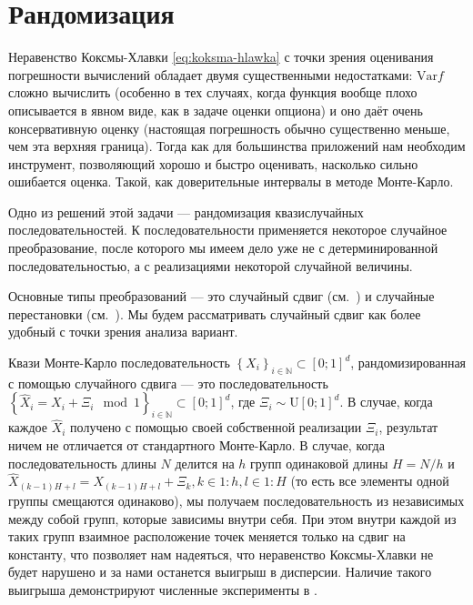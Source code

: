 \documentclass[specialist,
               substylefile = ../spbu.rtx,
               subf,href,colorlinks=true, 12pt]{disser}
\begin{document}
\section{Рандомизация} %
\label{sec:randomization}

Неравенство Коксмы-Хлавки \eqref{eq:koksma-hlawka} с точки зрения оценивания погрешности вычислений обладает двумя существенными недостатками: $\mathrm{Var}f$ сложно вычислить (особенно в тех случаях, когда функция вообще плохо описывается в явном виде, как в задаче оценки опциона) и оно даёт очень консервативную оценку (настоящая погрешность обычно существенно меньше, чем эта верхняя граница). Тогда как для большинства приложений нам необходим инструмент, позволяющий хорошо и быстро оценивать, насколько сильно ошибается оценка. Такой, как доверительные интервалы в методе Монте-Карло.

Одно из решений этой задачи --- рандомизация квазислучайных последовательностей. К последовательности применяется некоторое случайное преобразование, после которого мы имеем дело уже не с детерминированной последовательностью, а с реализациями некоторой случайной величины.

Основные типы преобразований --- это случайный сдвиг (см.~\cite{Tuffin2004}) и случайные перестановки (см.~\cite{Owen1995}). Мы будем рассматривать случайный сдвиг как более удобный с точки зрения анализа вариант.

Квази Монте-Карло последовательность $\left\{ X_i\right\}_{i \in \mathbb N} \subset \left[0;1\right]^d$, рандомизированная с помощью случайного сдвига --- это последовательность $\left\{ \hat X_i = X_i + \Xi_i \mod 1\right\}_{i \in \mathbb N} \subset \left[0;1\right]^d$, где $\Xi_i \sim \mathrm U\left[0;1\right]^d$. В случае, когда каждое $\hat X_i$ получено с помощью своей собственной реализации $\Xi_i$, результат ничем не отличается от стандартного Монте-Карло. В случае, когда последовательность длины $N$ делится на $h$ групп одинаковой длины $H = N / h$ и $\hat X_{\left(k - 1\right)H + l} = X_{\left(k - 1\right)H + l} + \Xi_k, k \in 1\mathbin{:}h, l \in 1\mathbin{:}H$ (то есть все элементы одной группы смещаются одинаково), мы получаем последовательность из независимых между собой групп, которые зависимы внутри себя. При этом внутри каждой из таких групп взаимное расположение точек меняется только на сдвиг на константу, что позволяет нам надеяться, что неравенство Коксмы-Хлавки не будет нарушено и за нами останется выигрыш в дисперсии. Наличие такого выигрыша демонстрируют численные эксперименты в \cite{Tuffin2004}.
\end{document}
